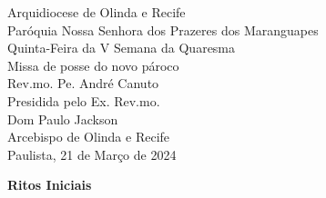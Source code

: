 \documentclass{book}
\begin{document}
\begin{center}
    \LARGE Arquidiocese de Olinda e Recife
    \vspace{.3cm} \\
    \Large Paróquia Nossa Senhora dos Prazeres dos Maranguapes
    \vspace{3cm} \\
    \textcolor{VioletRed2}{\huge Quinta-Feira da V Semana da Quaresma}
    \vspace{3cm} \\
    \LARGE Missa de posse do novo pároco \\ Rev.mo. Pe. André Canuto
    \vspace{.5cm} \\
    \Large Presidida pelo Ex. Rev.mo.
    \vspace{.2cm} \\
    \textcolor{VioletRed2}{\huge Dom Paulo Jackson}
    \vspace{.2cm} \\
    \Large Arcebispo de Olinda e Recife
    \vspace{\fill}\\
    \Large Paulista, 21 de Março de 2024
\end{center}
\newpage
\begin{center}
    \textbf{Ritos Iniciais}
\end{center}
\end{document}
